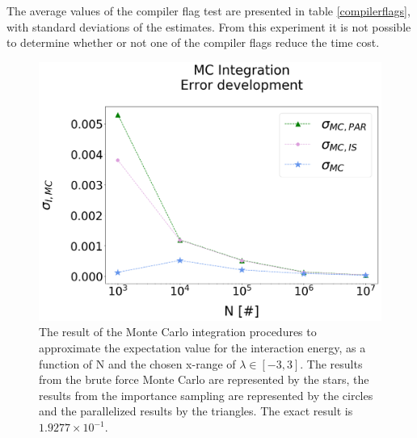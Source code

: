 \documentclass[%
reprint,
amsmath,amssymb,
aps,
]{revtex4-1}
\begin{document}
The average values of the compiler flag test are presented in table \ref{compilerflags}, with standard deviations of the estimates. From this experiment it is not possible to determine whether or not one of the compiler flags reduce the time cost. 
\newpage
\begin{figure}[!ht]
	\includegraphics[scale = 0.22]{MC_integration_error.png}
	\caption{\label{mc_pt} The result of the Monte Carlo integration procedures to approximate the expectation value for the interaction energy, as a function of N and the chosen x-range of $\lambda \in[-3,3]$. The results from the brute force Monte Carlo are represented by the stars, the results from the importance sampling are represented by the circles and the parallelized results by the triangles. The exact result is $1.9277\times 10^{-1}$. }
\end{figure} 
\end{document}
